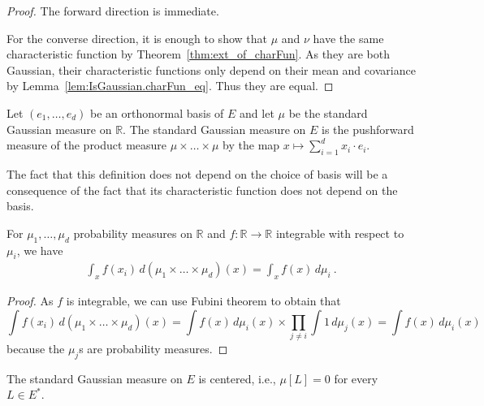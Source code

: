 \begin{proof}  
The forward direction is immediate.

For the converse direction, it is enough to show that $\mu$ and $\nu$ have the same characteristic function by Theorem~\ref{thm:ext_of_charFun}. As they are both Gaussian, their characteristic functions only depend on their mean and covariance by Lemma~\ref{lem:IsGaussian.charFun_eq}. Thus they are equal.
\end{proof}


\begin{definition}\label{def:stdGaussian}
Let $(e_1, \ldots, e_d)$ be an orthonormal basis of $E$ and let $\mu$ be the standard Gaussian measure on $\mathbb{R}$.
The standard Gaussian measure on $E$ is the pushforward measure of the product measure $\mu \times \ldots \times \mu$ by the map $x \mapsto \sum_{i=1}^d x_i \cdot e_i$.
\end{definition}

The fact that this definition does not depend on the choice of basis will be a consequence of the fact that its characteristic function does not depend on the basis.


\begin{lemma}\label{lem:integral_eval_pi}
  \mathlibok
For $\mu_1, \ldots, \mu_d$ probability measures on $\mathbb{R}$ and $f : \mathbb{R} \to \mathbb{R}$ integrable with respect to $\mu_i$, we have
\begin{align*}
  \int_x f(x_i) \, d(\mu_1 \times \ldots \times \mu_d)(x)
  = \int_x f(x) \, d\mu_i
  \: .
\end{align*}
\end{lemma}

\begin{proof}As $f$ is integrable, we can use Fubini theorem to obtain that
$$\int f(x_i) \, d(\mu_1 \times \ldots \times \mu_d)(x) = \int f(x) \, d\mu_i(x) \times \prod_{j \ne i} \int 1 \, d\mu_j(x) = \int f(x) \, d\mu_i(x)$$
because the $\mu_j$s are probability measures.
\end{proof}


\begin{lemma}\label{lem:isCentered_stdGaussian}
The standard Gaussian measure on $E$ is centered, i.e., $\mu[L] = 0$ for every $L \in E^*$.
\end{lemma}

